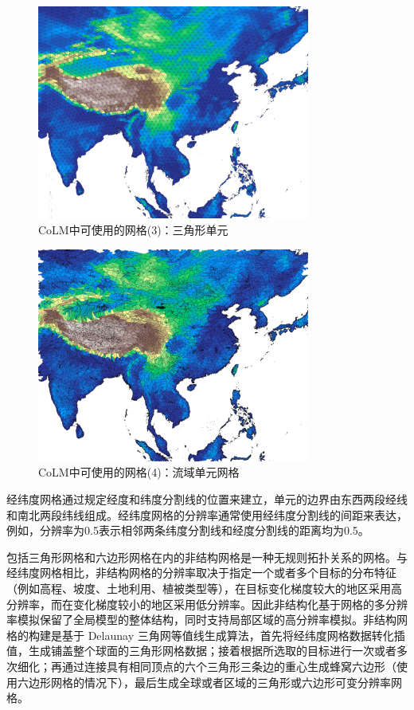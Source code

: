  {
\begin{figure}[htbp]
\centering
\includegraphics[width=0.8\textwidth]{Figures/模式构架/网格-三角形.jpg}
\caption{CoLM中可使用的网格(3)：三角形单元}
\label{fig:三角形单元网格}
\end{figure}
}
 {
\begin{figure}[htbp]
\centering
\includegraphics[width=0.8\textwidth]{Figures/模式构架/网格-流域.jpg}
\caption{CoLM中可使用的网格(4)：流域单元网格}
\label{fig:流域单元网格}
\end{figure}
}

经纬度网格通过规定经度和纬度分割线的位置来建立，单元的边界由东西两段经线和南北两段纬线组成。经纬度网格的分辨率通常使用经纬度分割线的间距来表达，例如，分辨率为0.5\textdegree 表示相邻两条纬度分割线和经度分割线的距离均为0.5\textdegree。


包括三角形网格和六边形网格在内的非结构网格是一种无规则拓扑关系的网格。与经纬度网格相比，非结构网格的分辨率取决于指定一个或者多个目标的分布特征（例如高程、坡度、土地利用、植被类型等），在目标变化梯度较大的地区采用高分辨率，而在变化梯度较小的地区采用低分辨率。因此非结构化基于网格的多分辨率模拟保留了全局模型的整体结构，同时支持局部区域的高分辨率模拟。非结构网格的构建是基于 Delaunay 三角网等值线生成算法，首先将经纬度网格数据转化插值，生成铺盖整个球面的三角形网格数据；接着根据所选取的目标进行一次或者多次细化；再通过连接具有相同顶点的六个三角形三条边的重心生成蜂窝六边形（使用六边形网格的情况下），最后生成全球或者区域的三角形或六边形可变分辨率网格。

